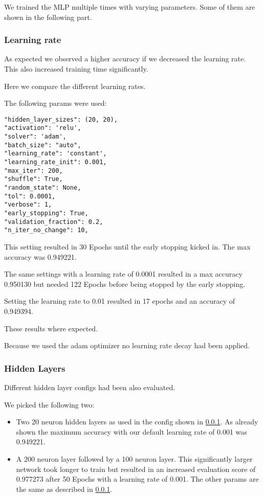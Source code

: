 \documentclass[a4paper, 11pt]{article}
\begin{document}
We trained the MLP multiple times with varying parameters.
Some of them are shown in the following part.

\subsubsection{Learning rate} \label{mnist_lr}
As expected we observed a higher accuracy if we decreased the learning rate.
This also increased training time significantly.

Here we compare the different learning rates.

The following params were used:

\begin{verbatim}
"hidden_layer_sizes": (20, 20),
"activation": 'relu',
"solver": 'adam',
"batch_size": "auto",
"learning_rate": 'constant',
"learning_rate_init": 0.001,
"max_iter": 200,
"shuffle": True,
"random_state": None,
"tol": 0.0001,
"verbose": 1,
"early_stopping": True,
"validation_fraction": 0.2,
"n_iter_no_change": 10,
\end{verbatim}

This setting resulted in 30 Epochs until the early stopping kicked in.
The max accuracy was 0.949221.

The same settings with a learning rate of 0.0001 resulted in a max accuracy 0.950130 but needed 122 Epochs before being stopped by the early stopping.

Setting the learning rate to 0.01 resulted in 17 epochs and an accuracy of 0.949394.

These results where expected.

Because we used the adam optimizer no learning rate decay had been applied.

\subsubsection{Hidden Layers}

Different hidden layer configs had been also evaluated.

We picked the following two:

\begin{itemize}
    \item Two 20 neuron hidden layers as used in the config shown in \ref{mnist_lr}.
    As already shown the maximum accuracy with our default learning rate of 0.001 was 0.949221.
    \item A 200 neuron layer followed by a 100 neuron layer.
    This significantly larger network took longer to train but resulted in an increased evaluation score of 0.977273 after 50 Epochs with a learning rate of 0.001.
    The other params are the same as described in \ref{mnist_lr}.
\end{itemize}
\end{document}

